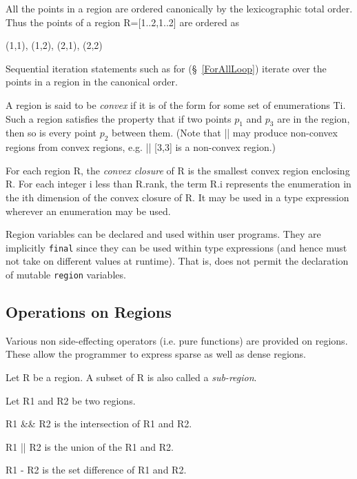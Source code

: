 All the points in a region are ordered canonically by the lexicographic total order. Thus the points of a region {\cf R=[1..2,1..2]} are ordered as 
\begin{x10}
  (1,1), (1,2), (2,1), (2,2)
\end{x10}
Sequential iteration statements such as {\cf for} (\S~\ref{ForAllLoop})
iterate over the points in a region in the canonical order.

A region is said to be {\em convex} if it is of
the form {\cf [T1,..., Tk]} for some set of enumerations {\cf Ti}. Such a
region satisfies the property that if two points $p_1$ and $p_3$ are
in the region, then so is every point $p_2$ between them. (Note that
{\cf ||} may produce non-convex regions from convex regions, e.g.{}
{\cf [1,1] || [3,3]} is a non-convex region.)

For each region {\cf R}, the {\em convex closure} of {\cf R} is the
smallest convex region enclosing {\cf R}.  For each integer {\cf i}
less than {\cf R.rank}, the term {\cf R.i} represents the enumeration
in the {\cf i}th dimension of the convex closure of {\cf R}. It may be
used in a type expression wherever an enumeration may be used.

Region variables can be declared and used within user programs. They
are implicitly {\tt final} since they can be used within type
expressions (and hence must not take on different values at
runtime). That is, \Xten{} does not permit the declaration of mutable
{\tt region} variables.

\subsection{Operations on Regions}
Various non side-effecting operators (i.e.{} pure functions) are
provided on regions. These allow the programmer to express sparse as
well as dense regions.

Let {\cf R} be a region. A subset of {\cf R} is also called a {\em
sub-region}.

Let {\cf R1} and {\cf R2} be two regions.

{\cf R1 \&\& R2} is the intersection of {\cf R1} and {\cf R2}.

{\cf R1 || R2} is the union of the {\cf R1} and {\cf R2}.

{\cf R1 - R2} is the set difference of {\cf R1} and {\cf R2}.

